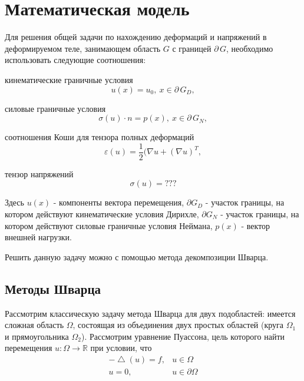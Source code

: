 \documentclass[a4paper]{article}
\begin{document}
 
\section{Математическая модель}

Для решения общей задачи по нахождению деформаций и напряжений в деформируемом теле, занимающем область $G$ с границей $\partial \, G$, необходимо использовать следующие соотношения:

кинематические граничные условия
\begin{equation}
u(x) = u_0, \ x \in \partial \, G_D,
\end{equation}

силовые граничные условия
\begin{equation}
\sigma(u) \cdot n = p(x), \ x \in \partial \, G_N,
\end{equation}

соотношения Коши для тензора полных деформаций
\begin{equation}
\varepsilon(u)=\dfrac{1}{2}(\nabla u + (\nabla u)^T,
\end{equation}

тензор напряжений
\begin{equation}
\sigma(u)=???
\end{equation}

Здесь $u(x)$ - компоненты вектора перемещения, $\partial G_D$ - участок границы, на котором действуют кинематические условия Дирихле, $\partial G_N$ - участок границы, на котором действуют силовые граничные условия Неймана, $p(x)$ - вектор внешней нагрузки. 

Решить данную задачу можно с помощью метода декомпозиции Шварца.

\subsection{Методы Шварца}
Рассмотрим классическую задачу метода Шварца для двух подобластей: имеется сложная область $\Omega$, состоящая из объединения двух простых областей (круга $\Omega_1$ и прямоугольника $\Omega_2$). Рассмотрим уравнение Пуассона, цель которого найти перемещения $u: \Omega \rightarrow \mathbb{R}$ при условии, что
\begin{equation*}
\begin{array}{rl}
-\bigtriangleup \!(u) = f, & u \in \Omega \\
u = 0, & u \in \partial \Omega
\end{array}
\end{equation*}
\end{document}
